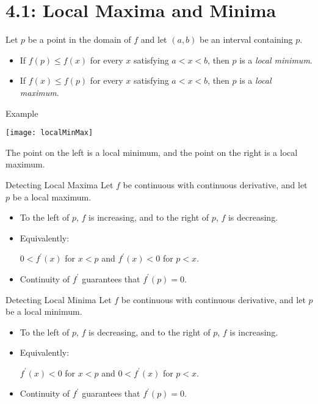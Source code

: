 \documentclass[Lecture.tex]{subfiles}
\begin{document}
\section{4.1: Local Maxima and Minima}

\begin{frame}
  \begin{defn}
    Let $p$ be a point in the domain of $f$ and let $(a,b)$ be an interval containing $p$.
    \begin{itemize}
    \item<2->
      If $f(p) \leq f(x)$ for every $x$ satisfying $a < x < b$, then $p$ is a {\it local minimum}.
    \item<3->
      If $f(x) \leq f(p)$ for every $x$ satisfying $a < x < b$, then $p$ is a {\it local maximum}.
    \end{itemize}
  \end{defn}
\end{frame}

\begin{frame}{Example}
  \begin{center}
    \texttt{[image: localMinMax]}
  \end{center}
  The point on the left is a local minimum, and the point on the right is a local maximum.
\end{frame}

\begin{frame}{Detecting Local Maxima}
  Let $f$ be continuous with continuous derivative, and let $p$ be a local maximum.
  \begin{itemize}
  \item<2->
    To the left of $p$, $f$ is increasing, and to the right of $p$, $f$ is decreasing.
  \item<3->
    Equivalently:
    \begin{center}
      $0 < f^\prime(x)$ for $x < p$
      \quad and \quad 
      $f^\prime(x) < 0$ for $p < x$.
    \end{center}
  \item<4->
    Continuity of $f^\prime$ guarantees that $f^\prime(p) = 0$.
  \end{itemize}
\end{frame}

\begin{frame}{Detecting Local Minima}
  Let $f$ be continuous with continuous derivative, and let $p$ be a local minimum.
  \begin{itemize}
  \item<2->
    To the left of $p$, $f$ is decreasing, and to the right of $p$, $f$ is increasing.
  \item<3->
    Equivalently:
    \begin{center}
      $f^\prime(x) < 0$ for $x < p$ \quad and \quad $0 < f^\prime(x)$ for $p < x$.
    \end{center}
  \item<4->
    Continuity of $f^\prime$ guarantees that $f^\prime(p) = 0$.
  \end{itemize}
\end{frame}
\end{document}
